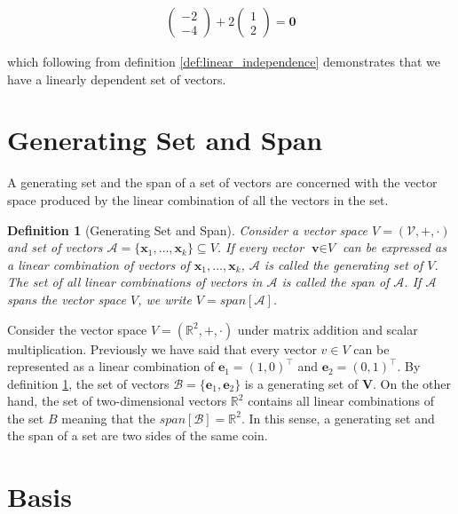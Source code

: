 \documentclass[a4paper,12pt]{book}
\newcommand{\set}[1]{\mathcal{#1}}
\newcommand{\vectr}[1]{\textbf{#1}}
\newcommand{\real}{\mathbb{R}}
\newcommand{\italic}[1]{\textit{#1}}
\newtheorem{definition}{Definition}[section]
\begin{document}
	\begin{align}
		\begin{pmatrix} -2 \\ -4 \end{pmatrix} + 2 \begin{pmatrix} 1 \\ 2 \end{pmatrix} = \vectr{0}
	\end{align}
	
	which following from definition \ref{def:linear_independence} demonstrates that we have a linearly dependent set of vectors.
	\section{Generating Set and Span}
	
	A generating set and the span \cite[page 44]{mml_book} of a set of vectors are concerned with the vector space produced by the linear combination of all the vectors in the set.
	
	\begin{definition}[Generating Set and Span]
		\normalfont Consider a vector space $\italic{V} = (\set{V}, +, \cdot)$ and set of vectors $\set{A} = \{\vectr{x}_1,\ldots,\vectr{x}_k\} \subseteq \italic{V}$. If every vector $\vectr{v} \in \italic{V}$ can be expressed as a linear combination of vectors of $\vectr{x}_1,\ldots,\vectr{x}_k$, $\set{A}$ is called the generating set of $\italic{V}$. The set of all linear combinations of vectors in $\set{A}$ is called the span of $\set{A}$. If $\set{A}$ spans the vector space $\italic{V}$, we write $\italic{V} = span[\set{A}]$. 
		\label{def:generating_set_span}
	\end{definition}
	
	Consider the vector space $ V = (\real^{2}, +, \cdot) $ under matrix addition and scalar multiplication. Previously we have said that every vector $ v \in V $ can be represented as a linear combination of $\vectr{e}_1 = (1, 0)^{\top}$ and $\vectr{e}_2 = (0, 1)^{\top}$. By definition \ref{def:generating_set_span}, the set of vectors $ \set{B} = \{ \vectr{e}_1, \vectr{e}_2 \} $ is a generating set of $ \vectr{V} $. 
	On the other hand, the set of two-dimensional vectors $ \real^{2} $ contains all linear combinations of the set $ B $ meaning that the $ span[\set{B}] = \real^{2} $. In this sense, a generating set and the span of a set are two sides of the same coin.
	\section{Basis}
	
\end{document}
